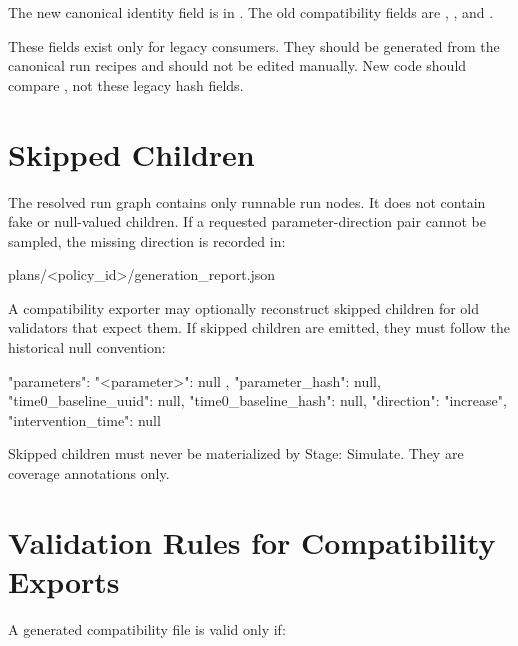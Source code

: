 \documentclass[11pt]{article}
\begin{document}
The new canonical identity field is  in .
The old compatibility fields are , , and .

These fields exist only for legacy consumers.
They should be generated from the canonical run recipes and should not be edited manually.
New code should compare , not these legacy hash fields.

\section*{Skipped Children}

The resolved run graph contains only runnable run nodes.
It does not contain fake or null-valued children.
If a requested parameter-direction pair cannot be sampled, the missing direction is recorded in:

\begin{DocCode}
plans/<policy_id>/generation_report.json
\end{DocCode}

A compatibility exporter may optionally reconstruct skipped children for old validators that expect them.
If skipped children are emitted, they must follow the historical null convention:

\begin{DocCode}
{
  "parameters": {
    "<parameter>": null
  },
  "parameter_hash": null,
  "time0_baseline_uuid": null,
  "time0_baseline_hash": null,
  "direction": "increase",
  "intervention_time": null
}
\end{DocCode}

Skipped children must never be materialized by Stage: Simulate.
They are coverage annotations only.

\section*{Validation Rules for Compatibility Exports}

A generated compatibility file is valid only if:
\end{document}
